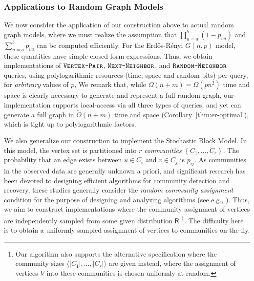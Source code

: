 \subsubsection{Applications to Random Graph Models}
\label{sec:applications_to_random_graph_models}
We now consider the application of our construction above to actual random graph models,
where we must realize the assumption that $\prod^{b}_{u=a} (1-p_{vu})$ and $\sum^{b}_{u=a} p_{vu}$ can be computed efficiently.
For the Erd\"{o}s-R\'{e}nyi $G(n,p)$ model, these quantities have simple closed-form expressions.
Thus, we obtain implementations of $\texttt{\textsc{Vertex-Pair}}$, $\texttt{\textsc{Next-Neighbor}}$, and $\texttt{\textsc{Random-Neighbor}}$ queries,
using polylogarithmic resources (time, space and random bits) per query, for \emph{arbitrary} values of $p$,
We remark that, while $\Omega(n+m) = \Omega(p n^2)$ time and space is clearly necessary to generate and represent a full random graph,
our implementation supports local-access via all three types of queries, and yet can generate a full graph in $\widetilde{O}(n+m)$ time and space
(Corollary~\ref{thm:er-optimal}), which is tight up to polylogarithmic factors.

We also generalize our construction to implement the Stochastic Block Model.
In this model, the vertex set is partitioned into $r$ \emph{communities} $\left\{ C_1, \ldots, C_r \right\}$.
The probability that an edge exists between $u\in C_i$ and $v \in C_j$ is $p_{ij}$.
As communities in the observed data are generally unknown a priori,
and significant research has been devoted to designing efficient algorithms for community detection and recovery, these studies generally consider
the \emph{random community assignment} condition for the purpose of designing and analyzing algorithms (see e.g., \cite{mossel2015reconstruction}).
Thus, we aim to construct implementations where the community assignment of vertices are independently sampled from some given distribution $\mathsf{R}$
\footnote{Our algorithm also supports the alternative specification where the community sizes $\langle |C_1|, \ldots, |C_r|\rangle$
are given instead, where the assignment of vertices $V$ into these communities is chosen uniformly at random.}.
The difficulty here is to obtain a uniformly sampled assignment of vertices to communities on-the-fly.


